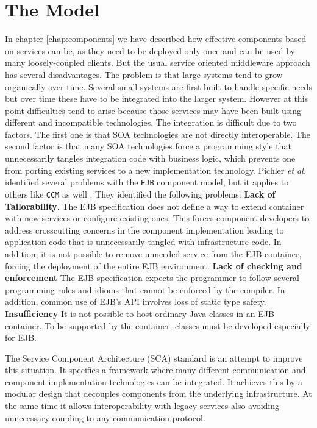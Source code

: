 
\section{The Model}
In chapter \ref{chap:components} we have described how effective components based on services can be, as they need to be deployed only
once and can be used by many loosely-coupled clients. But the usual service oriented middleware approach has several disadvantages.
The problem is that large systems tend to grow organically over time. Several small systems are first built to handle specific needs
but over time these have to be integrated into the larger system. However at this point difficulties tend to arise because
those services may have been built using different and incompatible technologies. The integration is difficult due to two
factors. The first one is that SOA technologies are not directly interoperable. The second factor is that many SOA technologies
force a programming style that unnecessarily tangles integration code with business logic, which prevents one from porting
existing services to a new implementation technology. Pichler \emph{et al.} identified several problems with the \texttt{EJB}
component model, but it applies to others like \texttt{CCM} as well \cite{Pichler}. They identified the following problems:
\textbf{Lack of Tailorability}. The EJB specification does not define a way to extend container with new services or configure
existing ones. This forces component developers to address crosscutting concerns in the component implementation leading to application
code that is unnecessarily tangled with infrastructure code. In addition, it is not possible to remove unneeded service from
the EJB container, forcing the deployment of the entire EJB environment. \textbf{Lack of checking and enforcement} The EJB
specification expects the programmer to follow several programming rules and idioms that cannot be enforced by the compiler.
In addition, common use of EJB's API involves loss of static type safety. \textbf{Insufficiency} It is not possible to host
ordinary Java classes in an EJB container. To be supported by the container, classes must be developed especially for EJB.

The Service Component Architecture (SCA) standard is an attempt to improve this situation. It specifies a framework
where many different communication and component implementation technologies can be integrated. It achieves this
by a modular design that decouples components from the underlying infrastructure. At the same time it allows
interoperability with legacy services also avoiding unnecessary coupling to any communication protocol.

